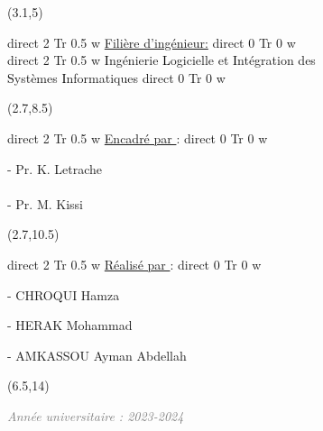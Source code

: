\documentclass{report}
\newcommand{\textBF}[1]{%
    \pdfliteral direct {2 Tr 0.5 w} %
     #1%
    \pdfliteral direct {0 Tr 0 w}%
}
\begin{document}
\begin{textblock}{10}(3.1,5)
    \begin{center}
    \begin{Huge}
        \color{bluetext}
        \textBF{\underline{Filière \underline{d'ingénieur}:}} \\
        \vspace{5mm} 
        \textBF{\textcolor{black}{I}ngénierie \textcolor{black}{L}ogicielle et \textcolor{black}{I}ntégration des\\\textcolor{black}{S}ystèmes \textcolor{black}{I}nformatiques}
    \end{Huge}
    \end{center}
\end{textblock}

\begin{textblock}{10}(2.7,8.5)
    \begin{Huge}
        \textBF{\textcolor{bluetext}{\underline{Encadré par }:}}
        
        \vspace{0.7cm}
        {\Large{- Pr. K. Letrache \\  }}
        \\
        {\Large{\hspace*{0.55cm}- Pr. M. Kissi}}
    \end{Huge}
\end{textblock}

\begin{textblock}{10}(2.7,10.5)
    \begin{Huge}
        \textBF{\textcolor{bluetext}{\underline{Réalisé par }:}}
        
        \vspace{0.7cm}
        \Large{- CHROQUI Hamza}

        \vspace{0.4cm}
        \Large{- HERAK Mohammad}

        \vspace{0.7cm}
        \Large{- AMKASSOU Ayman Abdellah}
    \end{Huge}
\end{textblock}

\begin{textblock}{10}(6.5,14)
    \begin{Large}
        \emph{\textcolor{gray}{Année universitaire : 2023-2024 }}
    \end{Large}
\end{textblock}
\end{document}
